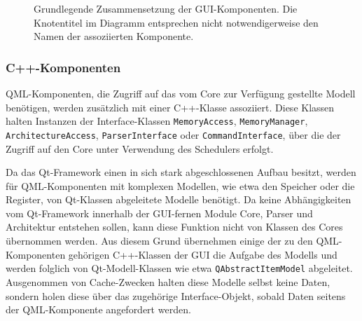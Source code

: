 \begin{figure}[H]
	\begin{center}
	\end{center}
	\caption{Grundlegende Zusammensetzung der GUI-Komponenten. Die Knotentitel im
	Diagramm entsprechen nicht notwendigerweise den Namen der assoziierten
	Komponente.}
	\label{fig:gui-composition}
\end{figure}

\subsubsection{C++-Komponenten}

QML-Komponenten, die Zugriff auf das vom Core zur Verfügung gestellte Modell
benötigen, werden zusätzlich mit einer C++-Klasse assoziiert. Diese Klassen
halten Instanzen der Interface-Klassen \texttt{MemoryAccess},
\texttt{MemoryManager}, \texttt{ArchitectureAccess}, \texttt{ParserInterface}
oder \texttt{CommandInterface}, über die der Zugriff auf den Core unter
Verwendung des Schedulers erfolgt.

Da das Qt-Framework einen in sich stark abgeschlossenen Aufbau besitzt, werden
für QML-Komponenten mit komplexen Modellen, wie etwa den Speicher oder die
Register, von Qt-Klassen abgeleitete Modelle benötigt. Da keine Abhängigkeiten
vom Qt-Framework innerhalb der GUI-fernen Module Core, Parser und Architektur
entstehen sollen, kann diese Funktion nicht von Klassen des Cores übernommen
werden. Aus diesem Grund übernehmen einige der zu den QML-Komponenten gehörigen
C++-Klassen der GUI die Aufgabe des Modells und werden folglich von
Qt-Modell-Klassen wie etwa \texttt{QAbstractItemModel} abgeleitet. Ausgenommen
von Cache-Zwecken halten diese Modelle selbst keine Daten, sondern holen diese
über das zugehörige Interface-Objekt, sobald Daten seitens der QML-Komponente
angefordert werden.

